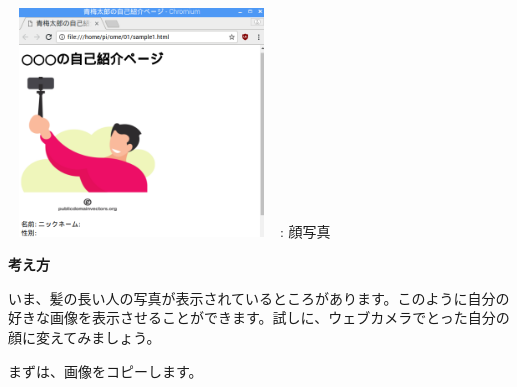 \documentclass[a4paper,12pt]{jarticle}
\begin{document}
\centering
\begin{minipage}{6.738cm}
  {\upshape
    \includegraphics[width=7.071cm,height=6.048cm]{textbook-img161.png}
    \newline
    : 顔写真}
\end{minipage}

\flushleft
\textbf{考え方}


いま、髪の長い人の写真が表示されているところがあります。このように自分の好きな画像を表示させることができます。試しに、ウェブカメラでとった自分の顔に変えてみましょう。

まずは、画像をコピーします。


\bigskip
\end{document}
